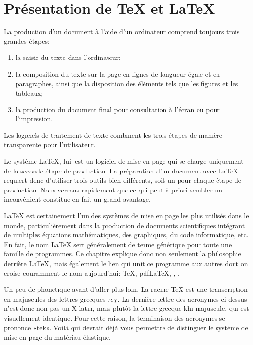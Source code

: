 
\chapter{Présentation de {\TeX} et {\LaTeX}}
\label{chap:presentation}

La production d'un document à l'aide d'un ordinateur comprend toujours
trois grandes étapes:
\begin{enumerate}
\item la saisie du texte dans l'ordinateur;
\item la composition du texte sur la page en lignes de longueur égale
  et en paragraphes, ainsi que la disposition des éléments tels que les
  figures et les tableaux;
\item la production du document final pour consultation à l'écran ou
  pour l'impression.
\end{enumerate}
Les logiciels de traitement de texte combinent les trois étapes de
manière transparente pour l'utilisateur.

Le système {\LaTeX}, lui, est un logiciel de mise en page qui se
charge uniquement de la seconde étape de production. La préparation
d'un document avec {\LaTeX} requiert donc d'utiliser trois outils bien
différents, soit un pour chaque étape de production. Nous verrons
rapidement que ce qui peut à priori sembler un inconvénient constitue
en fait un grand avantage.

{\LaTeX} est certainement l'un des systèmes de mise en page les plus
utilisés dans le monde, particulièrement dans la production de
documents scientifiques intégrant de multiples équations
mathématiques, des graphiques, du code informatique, etc. En fait, le
nom {\LaTeX} sert généralement de terme générique pour toute une
famille de programmes. Ce chapitre explique donc non seulement la
philosophie derrière {\LaTeX}, mais également le lien qui unit ce
programme aux autres dont on croise couramment le nom aujourd'hui:
{\TeX}, pdf{\LaTeX}, {\XeLaTeX}, {\LuaLaTeX}.

Un peu de phonétique avant d'aller plus loin. La racine {\TeX} est une
transcription en majuscules des lettres grecques $\tau\epsilon\chi$.
La dernière lettre des acronymes ci-dessus n'est donc non pas un X
latin, mais plutôt la lettre grecque khi majuscule, qui est
visuellement identique. Pour cette raison, la terminaison des
acronymes se prononce «tek». Voilà qui devrait déjà vous permettre de
distinguer le système de mise en page du matériau élastique.


